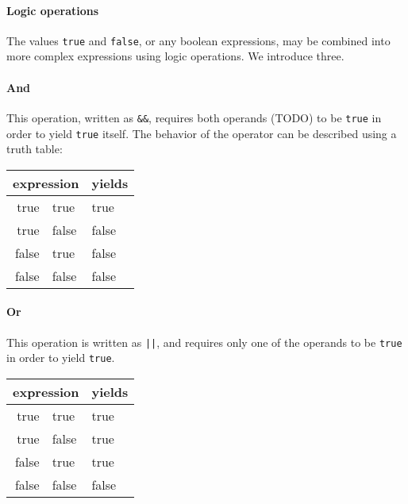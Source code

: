 \paragraph{Logic operations}

The values \texttt{true} and \texttt{false}, or any boolean expressions, may be combined into more complex expressions using logic operations. We introduce three.

\paragraph{And}

This operation, written as \texttt{\&\&}, requires both operands (TODO) to be \texttt{true} in order to yield \texttt{true} itself. The behavior of the operator can be described using a truth table:

\begin{center}
  \ttfamily
  \begin{tabular}{r@{ \&\& }l@{\qquad}l}
    \multicolumn{2}{l}{\normalfont expression} & {\normalfont yields} \\
    \midrule
    true & true   & true \\
    true & false & false \\
    false & true  & false \\
    false & false  & false \\
    \midrule
  \end{tabular}
\end{center}

\paragraph{Or}

This operation is written as \texttt{||}, and requires only one of the operands to be \texttt{true} in order to yield \texttt{true}. 

\begin{center}
  \ttfamily
  \begin{tabular}{r@{ || }l@{\qquad}l}
    \multicolumn{2}{l}{\normalfont expression} & {\normalfont yields} \\
    \midrule
    true  & true   & true \\
    true  & false  & true \\
    false & true   & true \\
    false & false  & false \\
    \midrule
  \end{tabular}
\end{center}

